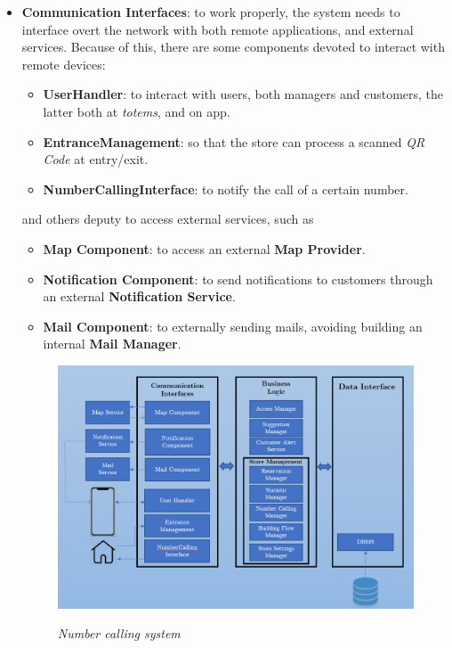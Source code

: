 \documentclass{article}
\begin{document}
	\begin{itemize}
		\item \textbf{Communication Interfaces}: to work properly, the system needs to interface overt the network with both remote applications, and external services. Because of this, there are some components devoted to interact with remote devices:
		\begin{itemize}
			\item{\bfseries UserHandler}: to interact with users, both managers and customers, the latter both at \emph{totems}, and on app.
			\item{\bfseries EntranceManagement}: so that the store can process a scanned \emph{QR Code} at entry/exit.
			\item{\bfseries NumberCallingInterface}: to notify the call of a certain number.
		\end{itemize}
		and others deputy to access external services, such as 
		\begin{itemize}
			\item{\bfseries Map Component}: to access an external {\bfseries Map Provider}.
			\item{\bfseries Notification Component}: to send notifications to customers through an external {\bfseries Notification Service}.
			\item{\bfseries Mail Component}: to externally sending mails, avoiding building an internal {\bfseries Mail Manager}.
		\end{itemize}
	\begin{figure}[!h]
		\centering
		\includegraphics[scale=0.5]{../UML Diagrams/CompositionDiagram/CompositionDiagram.png} \\
		\caption{\emph{Number calling system}}
	\end{figure}
	

\end{itemize}
\end{document}
